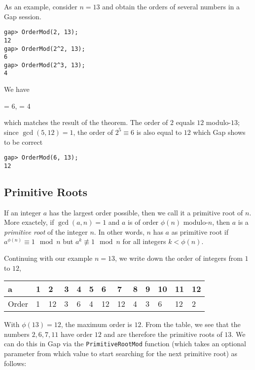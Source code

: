 As an example, consider $n=13$ and obtain the orders of several numbers in a Gap session.

\begin{verbatim}
gap> OrderMod(2, 13);
12
gap> OrderMod(2^2, 13);
6
gap> OrderMod(2^3, 13);
4
\end{verbatim}

We have

\bee
{} = 6, \quad {} = 4
\eee

which matches the result of the theorem. The order of $2$ equals $12$ modulo-$13$; since $\gcd(5, 12) = 1$, the order of $2^5 \equiv 6$ is also equal to $12$ which Gap shows to be correct

\begin{verbatim}
gap> OrderMod(6, 13);
12
\end{verbatim}

\subsection{Primitive Roots}\label{2021-03-02:primroots}

If an integer $a$ has the largest order possible, then we call it a primitive root of $n$. More exactely, if $\gcd(a,n)=1$ and $a$ is of order $\phi(n)$ modulo-$n$, then $a$ is a \emph{primitive root} of the integer $n$. In other words, $n$ has $a$ as primitive root if $a^{\phi(n)} \equiv 1 \mod n$ but $a^k \not \equiv 1 \mod n$ for all integers $k < \phi(n)$.

Continuing with our example $n=13$, we write down the order of integers from $1$ to $12$,

\vspace*{2mm}

\begin{tabular}{lllllllllllll}
  a     & 1 & 2  & 3 & 4 & 5 & 6  & 7  & 8 & 9 & 10 & 11 & 12 \\ \hline
  Order & 1 & 12 & 3 & 6 & 4 & 12 & 12 & 4 & 3 & 6  & 12 & 2 
\end{tabular}

\vspace*{2mm}

With $\phi(13) = 12$, the maximum order is $12$. From the table, we see that the numbers $2, 6, 7, 11$ have order $12$ and are therefore the primitive roots of $13$. We can do this in Gap via the \verb+PrimitiveRootMod+ function (which takes an optional parameter from which value to start searching for the next primitive root) as follows:

